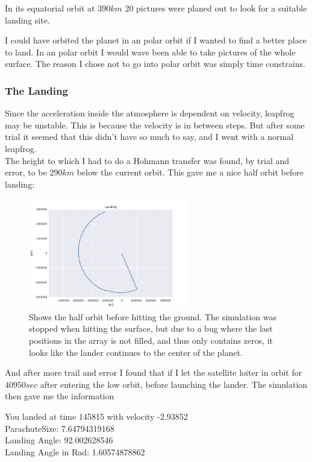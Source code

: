 \documentclass[a4paper, 10pt]{article}
\begin{document}
In its equatorial orbit at $390 km$ 20 pictures were planed out to look for a suitable landing site.


I could have orbited the planet in an polar orbit if I wanted to find a better place to land. In an polar orbit I would wave been able to take pictures of the whole surface. The reason I chose not to go into polar orbit was simply time constrains.

\subsubsection{The Landing}
Since the acceleration inside the atmosphere is dependent on velocity, leapfrog may be unstable. This is because the velocity is in between steps. But after some trial it seemed that this didn't have so much to say, and I went with a normal leapfrog.\\
 
The height to which I had to do a Hohmann transfer was found, by trial and error, to be $290 km$ below the current orbit. This gave me a nice half orbit before landing:

\begin{figure}[H]
\centering
\includegraphics[width = 70mm]{part7landing.png}
\caption{Shows the half orbit before hitting the ground. The simulation was stopped when hitting the surface, but due to a bug where the last positions in the array is not filled, and thus only contains zeros, it looks like the lander continues to the center of the planet.}
\end{figure}

And after more trail and error I found that if I let the satellite loiter in orbit for $40950 sec$ after entering the low orbit, before launching the lander. The simulation then gave me the information

\begin{tcolorbox}
You landed at time 145815 with velocity -2.93852\\
ParachuteSize:  7.64794319168\\
Landing Angle:  92.002628546\\
Landing Angle in Rad:  1.60574878862
\end{tcolorbox}
\end{document}
